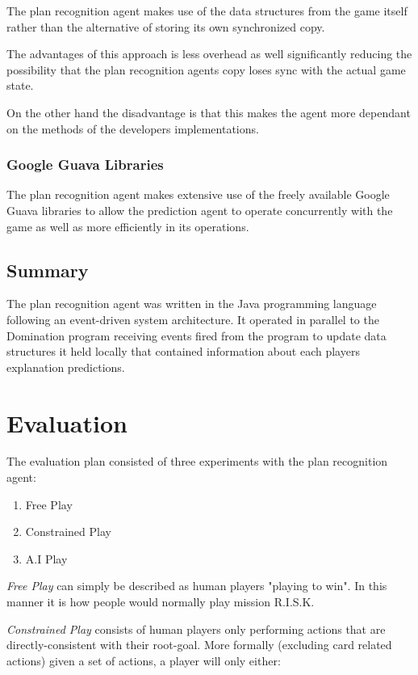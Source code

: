 \documentclass[parskip]{cs4rep}
\begin{document}
The plan recognition agent makes use of the data structures from the game itself rather than the alternative of storing its own synchronized copy.

The advantages of this approach is less overhead as well significantly reducing the possibility that the plan recognition agents copy loses sync with the actual game state. 

On the other hand the disadvantage is that this makes the agent more dependant on the methods of the developers implementations.

\subsection{Google Guava Libraries}

The plan recognition agent makes extensive use of the freely available Google Guava libraries to allow the prediction agent to operate concurrently with the game as well as more efficiently in its operations.

\section{Summary}

The plan recognition agent was written in the Java programming language following an event-driven system architecture. It operated in parallel to the Domination program receiving events fired from the program to update data structures it held locally that contained information about each players explanation predictions.

\chapter{Evaluation} 

The evaluation plan consisted of three experiments with the plan recognition agent:

\begin{enumerate}
\item
Free Play
\item
Constrained Play
\item
A.I Play
\end{enumerate}

\textit{Free Play} can simply be described as human players "playing to win". In this manner it is how people would normally play mission R.I.S.K.

\textit{Constrained Play} consists of human players only performing actions that are directly-consistent with their root-goal.  More formally (excluding card related actions) given a set of actions, a player will only either:
\end{document}
